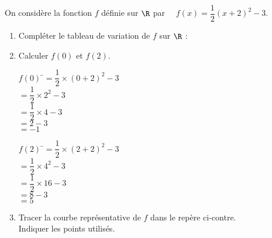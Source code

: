\documentclass[a4paper,11pt,exos]{nsi}
\begin{document}
\setcounter{section}{0}
\newpage

\maketitle


\exo{}
\textcolor{UGLiBlue}{On considère la fonction $f$ définie sur $\R$ par $\quad f(x)=\dfrac{1}{2}(x+2)^2-3$.}

\begin{enumerate}%
	\item 	\textcolor{UGLiBlue}{Compléter le tableau de variation de $f$ sur $\R$ :}
	\begin{center}
	\end{center}
	\item 	\textcolor{UGLiBlue}{Calculer $f(0)$ et $f(2)$.}
	\begin{multicols}{2}
        \begin{tabbing}
            $f(0)$  \=$=\dfrac{1}{2}\times (0+2)^2-3$\\[.5em]
                \>$=\dfrac{1}{2}\times 2^2-3$\\[.5em]
                \>$=\dfrac{1}{2}\times 4-3$\\
                \>$=2-3$\\
                \>$=-1$
        \end{tabbing}
        \begin{tabbing}
            $f(2)$  \=$=\dfrac{1}{2}\times (2+2)^2-3$\\[.5em]
                \>$=\dfrac{1}{2}\times 4^2-3$\\[.5em]
                \>$=\dfrac{1}{2}\times 16-3$\\
                \>$=8-3$\\
                \>$=5$
        \end{tabbing}
    \end{multicols}
	\item 	
	\begin{minipage}{7.7cm}
		\textcolor{UGLiBlue}{Tracer la courbe représentative de $f$ dans le repère ci-contre.\\
        Indiquer les points utilisés.}

\end{minipage}
\end{enumerate}
\end{document}
